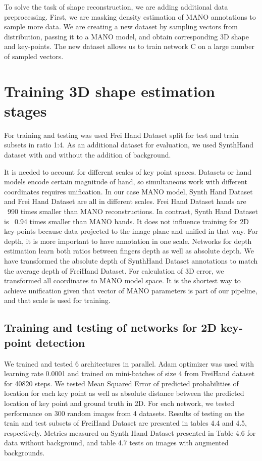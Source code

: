 To solve the task of shape reconstruction, we are adding additional data preprocessing. First, we are masking density estimation of MANO annotations to sample more data. We are creating a new dataset by sampling vectors from distribution, passing it to a MANO model, and obtain corresponding 3D shape and key-points. The new dataset allows us to train network C on a large number of sampled vectors. 

\section{Training 3D shape estimation stages}

For training and testing was used Frei Hand Dataset split for test and train subsets in ratio 1:4. As an additional dataset for evaluation, we used SynthHand dataset with and without the addition of background.

It is needed to account for different scales of key point spaces. Datasets or hand models encode certain magnitude of hand, so simultaneous work with different coordinates requires unification. In our case MANO model, Synth Hand Dataset and Frei Hand Dataset are all in different scales. Frei Hand Dataset hands are ~990 times smaller than MANO reconstructions. In contrast, Synth Hand Dataset is ~0.94 times smaller than MANO hands. It does not influence training for 2D key-points because data projected to the image plane and unified in that way. For depth, it is more important to have annotation in one scale. Networks for depth estimation learn both ratios between fingers depth as well as absolute depth. We have transformed the absolute depth of SynthHand Dataset annotations to match the average depth of FreiHand Dataset. For calculation of 3D error, we transformed all coordinates to MANO model space. It is the shortest way to achieve unification given that vector of MANO parameters is part of our pipeline, and that scale is used for training.

\subsection{Training and testing of networks for 2D key-point detection} 

We trained and tested 6 architectures in parallel. Adam optimizer was used with learning rate 0.0001 and trained on mini-batches of size 4 from FreiHand dataset for 40820 steps. We tested Mean Squared Error of predicted probabilities of location for each key point as well as absolute distance between the predicted location of key point and ground truth in 2D. For each network, we tested performance on 300 random images from 4 datasets. Results of testing on the train and test subsets of FreiHand Dataset are presented in tables 4.4 and 4.5, respectively. Metrics measured on Synth Hand Dataset presented in Table 4.6 for data without background, and table 4.7 tests on images with augmented backgrounds.

